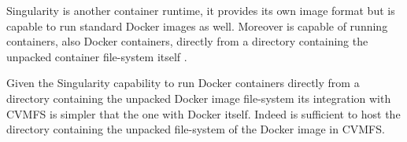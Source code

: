 Singularity \citep{singularity:home} is another container runtime, it provides
its own image format but is capable to run standard Docker images
\cite{singularity:docker} as well.  Moreover is capable of running containers,
also Docker containers, directly from a directory containing the unpacked
container file-system itself \cite{singularity:run}. 

Given the Singularity capability to run Docker containers directly from a
directory containing the unpacked Docker image file-system its integration with
CVMFS is simpler that the one with Docker itself. Indeed is sufficient to host
the directory containing the unpacked file-system of the Docker image in CVMFS.


